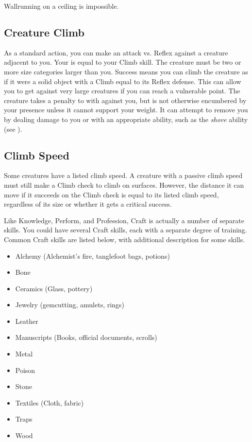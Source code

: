         Wallrunning on a ceiling is impossible.

    \subsection{Creature Climb}\label{Creature Climb}
        As a standard action, you can make an attack vs. Reflex against a creature adjacent to you.
        Your  is equal to your Climb skill.
        The creature must be two or more size categories larger than you.
        Success means you can climb the creature as if it were a solid object with a Climb  equal to its Reflex defense.
        This can allow you to get  against very large creatures if you can reach a vulnerable point.
        The creature takes a  penalty to  with  against you, but is not otherwise encumbered by your presence unless it cannot support your weight.
        It can attempt to remove you by dealing damage to you or with an appropriate ability, such as the \textit{shove} ability (see ).

    \subsection{Climb Speed}\label{Climb Speed}
        Some creatures have a listed climb speed.
        A creature with a passive climb speed must still make a Climb check to climb on surfaces.
        However, the distance it can move if it succeeds on the Climb check is equal to its listed climb speed, regardless of its size or whether it gets a critical success.

\newpage
{}
    Like Knowledge, Perform, and Profession, Craft is actually a number of separate skills.
    You could have several Craft skills, each with a separate degree of training.
    Common Craft skills are listed below, with additional description for some skills.

    \begin{itemize}
        \item Alchemy (Alchemist's fire, tanglefoot bags, potions)
        \item Bone
        \item Ceramics (Glass, pottery)
        \item Jewelry (gemcutting, amulets, rings)
        \item Leather
        \item Manuscripts (Books, official documents, scrolls)
        \item Metal
        \item Poison
        \item Stone
        \item Textiles (Cloth, fabric)
        \item Traps
        \item Wood
    \end{itemize}

